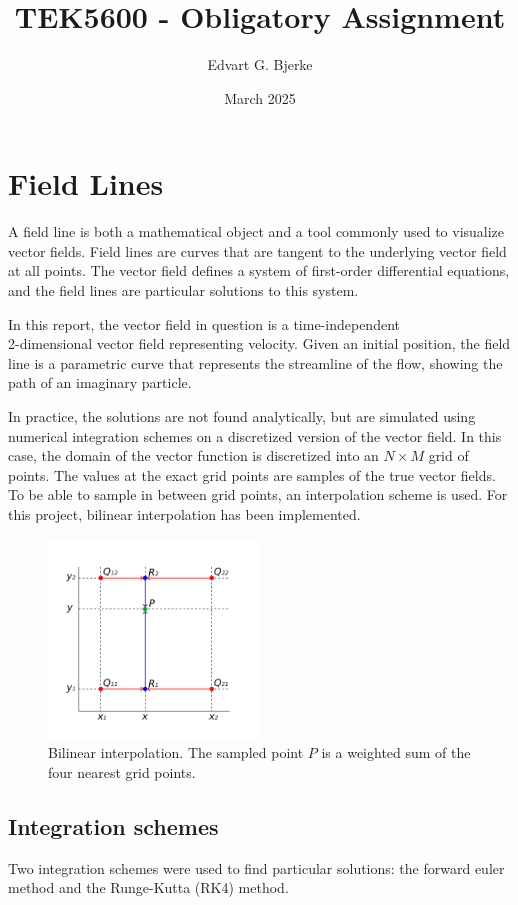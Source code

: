 \documentclass{article}
\title{TEK5600 - Obligatory Assignment}
\author{Edvart G. Bjerke}
\date{March 2025}
\begin{document}
\maketitle

\section{Field Lines}
A field line is both a mathematical object and a tool commonly used to visualize
vector fields. Field lines are curves that are tangent to the underlying vector field
at all points. The vector field defines a system of first-order differential equations, and the field lines are particular solutions to this system.

In this report, the vector field in question is a time-independent \\
2-dimensional vector field representing velocity.
Given an initial position, the field line is a parametric curve that represents the streamline of the flow, showing the path of an imaginary particle.

In practice, the solutions are not found analytically, but are simulated using 
numerical integration schemes on a discretized version of the vector field.
In this case, the domain of the vector function is discretized into an $N \times M$ grid of points.
The values at the exact grid points are samples of the true vector fields. To be able to
sample in between grid points, an interpolation scheme is used. For this project, bilinear interpolation has been implemented. 

\begin{figure}[h!]
    \centering
    \includegraphics[width=0.5\textwidth]{BilinearInterpolationV2.svg.png}
    \caption{Bilinear interpolation. The sampled point $P$ is a weighted sum of the four nearest grid points.}
\end{figure}

\subsection{Integration schemes}
Two integration schemes were used to find particular solutions: the forward euler method and the Runge-Kutta (RK4) method.
\end{document}
